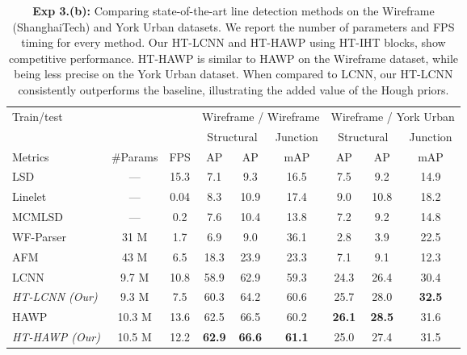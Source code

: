 \documentclass[runningheads]{llncs}
\begin{document}
\begin{table}[t!]
    \centering
        \begin{tabular}{p{8.2em} c@{\hskip 0.1in}ccc cccc }
        \toprule
        Train\slash test & & & \multicolumn{3}{c}{Wireframe / Wireframe} & 
        \multicolumn{3}{c}{Wireframe / York Urban}\\ \cmidrule(l){4-6}\cmidrule(l){7-9}
        & & & \multicolumn{2}{c}{Structural} & \multicolumn{1}{c}{Junction} &  \multicolumn{2}{c}{Structural} & \multicolumn{1}{c}{Junction} \\ \cmidrule(l){4-5}\cmidrule(l){6-6} \cmidrule(l){7-8} \cmidrule(l){9-9}
        Metrics & \#Params & FPS & AP & AP & mAP & AP & AP & mAP \\  \midrule
        LSD \cite{von2008lsd}       & --- & 15.3  & 7.1  & 9.3  & 16.5  & 7.5  & 9.2  & 14.9  \\
        Linelet \cite{cho2017novel}  & --- & 0.04 & 8.3  & 10.9 & 17.4 & 9.0  & 10.8 & 18.2 \\
        MCMLSD \cite{almazan2017mcmlsd} & ---& 0.2 & 7.6  & 10.4 & 13.8 & 7.2  & 9.2  & 14.8  \\
        WF-Parser \cite{huang2018learning} & 31 M & 1.7 & 6.9 & 9.0 & 36.1 & 2.8 & 3.9  & 22.5\\
        AFM \cite{xue2019learning} & 43 M & 6.5 & 18.3 & 23.9 & 23.3 & 7.1 & 9.1 & 12.3\\
        LCNN \cite{zhou2019end} & 9.7 M &10.8  & 58.9 & 62.9 & 59.3 & 24.3 & 26.4 & 30.4 \\
        \emph{HT-LCNN (Our)} & 9.3 M & 7.5 & 60.3 & 64.2 & 60.6 & 25.7 & 28.0 & \textbf{32.5}\\
        HAWP \cite{xue2020holistically}  & 10.3 M & 13.6 & 62.5 & 66.5 & 60.2 & \textbf{26.1} & \textbf{28.5} & 31.6\\
        \emph{HT-HAWP (Our)} & 10.5 M &12.2 & \textbf{62.9} & \textbf{66.6} & \textbf{61.1} & 25.0 & 27.4 & 31.5\\
        \bottomrule
        \end{tabular} 
    \caption{\textbf{Exp 3.(b):} 
    Comparing state-of-the-art line detection methods on the Wireframe (ShanghaiTech) and York Urban datasets.
    We report the number of parameters and FPS timing for every method. 
    Our HT-LCNN and HT-HAWP using HT-IHT blocks, show competitive performance. 
    HT-HAWP is similar to HAWP on the Wireframe dataset, while being less precise on the York Urban dataset. When compared to LCNN, our HT-LCNN consistently outperforms the baseline, illustrating the added value of the Hough priors. 
    }
    \label{tab:exp3_b}
\end{table}
\end{document}
